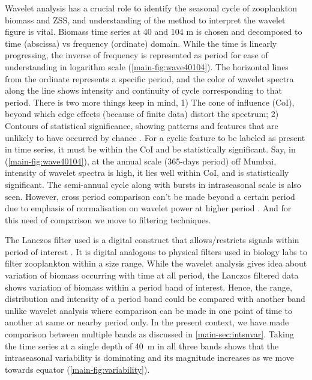 \documentclass{article}
\begin{document}
	Wavelet analysis has a crucial role to identify the seasonal cycle of zooplankton biomass and ZSS, and understanding of the method to interpret the wavelet figure is vital. Biomass time series at 40 and 104 m is chosen and decomposed to time (abscissa) vs frequency (ordinate) domain. While the time is linearly progressing, the inverse of frequency is represented as period for ease of understanding in logarithm scale (\cref{main-fig:wave40104}). The horizontal lines from the ordinate represents a specific period, and the color of wavelet spectra along the line shows intensity and continuity of cycle corresponding to that period. There is two more things keep in mind, 1) The cone of influence (CoI), beyond which edge effects (because of finite data) distort the spectrum; 2) Contours of statistical significance, showing patterns and features that are unlikely to have occurred by chance \citep{torrence1998practical}. For a cyclic feature to be labeled as present in time series, it must be within the CoI and be statistically significant. Say, in (\cref{main-fig:wave40104}), at the annual scale (365-days period) off Mumbai, intensity of wavelet spectra is high, it lies well within CoI, and is statistically significant. The semi-annual cycle along with bursts in intraseasonal scale is also seen. However, cross period comparison can't be made beyond a certain period due to emphasis of normalisation on wavelet power at higher period \citep{maraun2004cross}. And for this need of comparison we move to filtering techniques.
	
	The Lanczos filter used is a digital construct that allows/restricts signals within period
	of interest \citep{duchon1979lanczos}. It is digital analogous to physical filters used in biology labs to filter zooplankton within a size range. While the wavelet analysis gives idea about variation of biomass occurring with time at all period, the Lanczos filtered data shows variation of biomass within a period band of interest. Hence, the range, distribution and intensity of a period band could be compared with another band unlike wavelet analysis where comparison can be made in one point of time to another at same or nearby period only. In the present context, we have made comparison between multiple bands as discussed in \autoref{main-sec:intsnvar}. Taking the time series at a single depth of 40~m in all three bands shows that the intraseasonal variability is dominating and its magnitude increases as we move towards equator (\cref{main-fig:variability}).
	
\linespread{1.5}	
{\footnotesize 	 %
}	
\end{document}

